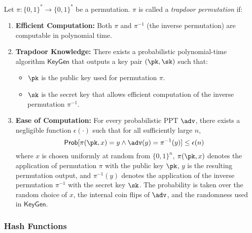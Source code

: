 \documentclass{iacrcc}
\begin{document}
\begin{definition}
Let $\pi: \{0,1\}^* \to \{0,1\}^*$ be a permutation. $\pi$ is called a \textit{trapdoor permutation} if:
\begin{enumerate}
\item \textbf{Efficient Computation:} Both $\pi$ and $\pi^{-1}$ (the inverse permutation) are computable in polynomial time.
\item \textbf{Trapdoor Knowledge:} There exists a probabilistic polynomial-time algorithm $\mathsf{KeyGen}$ that outputs a key pair $(\pk, \sk)$ such that:
\begin{itemize}
\item $\pk$ is the public key used for permutation $\pi$.
\item $\sk$ is the secret key that allows efficient computation of the inverse permutation $\pi^{-1}$.
\end{itemize}
\item \textbf{Ease of Computation:} For every probabilistic PPT $\adv$, there exists a negligible function $\epsilon(\cdot)$ such that for all sufficiently large $n$,
\[
\Pr[\pi(\pk, x) = y \wedge \adv(y) = \pi^{-1}(y)] \leq \epsilon(n)
\]
where $x$ is chosen uniformly at random from $\{0,1\}^n$, $\pi(\pk, x)$ denotes the application of permutation $\pi$ with the public key $\pk$, $y$ is the resulting permutation output, and $\pi^{-1}(y)$ denotes the application of the inverse permutation $\pi^{-1}$ with the secret key $\sk$. The probability is taken over the random choice of $x$, the internal coin flips of $\adv$, and the randomness used in $\mathsf{KeyGen}$.
\end{enumerate}
\end{definition}

\subsubsection{Hash Functions}
\end{document}
